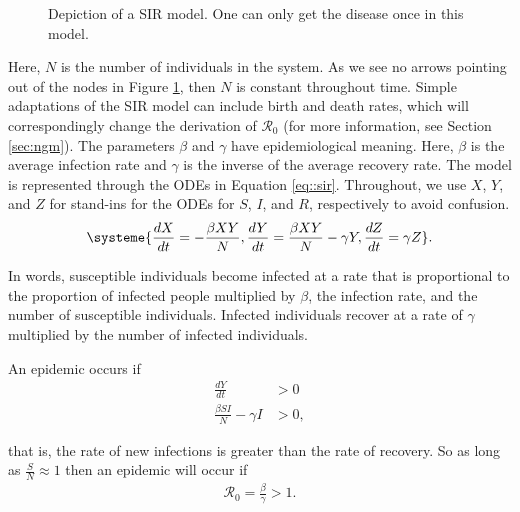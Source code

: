 \documentclass[12pt]{article}
\newcommand{\rr}{\ensuremath{\mathcal{R}_0}}
\begin{document}
\begin{figure}[h]
\centering
{}
\caption{Depiction of a SIR model.  One can only get the disease once in this model.}\label{fig::sir}
\end{figure}
Here, $N$ is the number of individuals in the system.  As we see no arrows pointing out of the nodes in Figure \ref{fig::sir}, then $N$ is constant throughout time.  Simple adaptations of the SIR model can include birth and death rates, which will correspondingly change the derivation of $\rr$ (for more information, see Section \ref{sec:ngm}). The parameters  $\beta$ and $\gamma$ have epidemiological meaning.  Here, $\beta$ is the average infection rate and $\gamma$ is the inverse of the average recovery rate.  The model is represented through the ODEs in Equation \ref{eq::sir}.  Throughout, we use $X$, $Y$, and $Z$ for stand-ins for the ODEs for $S$, $I$, and $R$, respectively to avoid confusion.
\begin{align}
\systeme{\frac{dX}{dt} = -\frac{\beta XY}{N}, \frac{dY}{dt} = \frac{\beta XY}{N} - \gamma Y, \frac{dZ}{dt} = \gamma Z}. \label{eq::sir}
\end{align}

In words, susceptible individuals become infected at a rate that is proportional to the proportion of infected people multiplied by $\beta$, the infection rate, and the number of susceptible individuals.  Infected individuals recover at a rate of $\gamma$ multiplied by the number of infected individuals.

An epidemic occurs if 
\begin{align*}
  \frac{dY}{dt} &> 0 \\
\frac{\beta S I}{N}  - \gamma I &> 0 ,
\end{align*}

that is,  the rate of new infections is greater than the rate of recovery.  So as long as $\frac{S}{N} \approx 1$ then an epidemic will occur if
\begin{align}\label{eq:sir_r0}
  \rr = \frac{\beta}{\gamma} > 1.
  \end{align}
\end{document}
